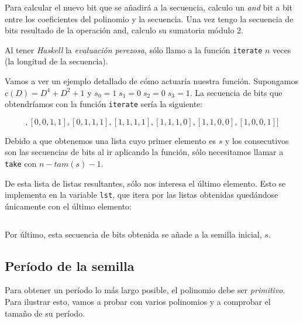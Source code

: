 \documentclass[10pt,spanish]{article}
\begin{document}
Para calcular el nuevo bit que se añadirá a la secuencia, calculo un \textit{\textcolor{azul}{and}} bit a bit entre los coeficientes del polinomio y la secuencia. Una vez tengo la secuencia de bits resultado de la operación and, calculo su sumatoria módulo 2. 

Al tener \textit{\textcolor{azul}{Haskell}} la \textit{\textcolor{azul}{evaluación perezosa}}, sólo llamo a la función \texttt{iterate} $n$ veces (la longitud de la secuencia).

Vamos a ver un ejemplo detallado de cómo actuaría nuestra función. Supongamos $c(D) = D^4 + D^2 + 1$ y $s_0 = 1 \; s_1 = 0 \; s_2 = 0 \; s_3 = 1$. La secuencia de bits que obtendríamos con la función \texttt{iterate} sería la siguiente:

\begin{displaymath}
[[1,0,0,1],[0,0,1,1],[0,1,1,1],[1,1,1,1],[1,1,1,0],[1,1,0,0],[1,0,0,1]]
\end{displaymath}

Debido a que obtenemos una lista cuyo primer elemento es $s$ y los consecutivos son las secuencias de bits al ir aplicando la función, sólo necesitamos llamar a \texttt{take} con $n - tam(s)-1$. 

De esta lista de listas resultantes, sólo nos interesa el último elemento. Esto se implementa en la variable \texttt{lst}, que itera por las listas obtenidas quedándose únicamente con el último elemento:

\begin{displaymath}
[1,1,1,0,0,1]
\end{displaymath}

Por último, esta secuencia de bits obtenida se añade a la semilla inicial, $s$.

\subsection{\textcolor{azul}Período de la semilla}
Para obtener un período lo más largo posible, el polinomio debe ser \textit{\textcolor{azul}{primitivo}}. Para ilustrar esto, vamos a probar con varios polinomios y a comprobar el tamaño de su período.
\end{document}
